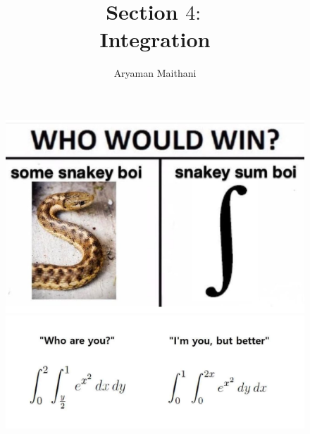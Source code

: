 \documentclass[handout, aspectratio=169]{beamer}
\begin{document}
\title{Section $4:$\\ Integration}
\author{ }
\begin{frame} 
	\titlepage
\end{frame}
	\author{Aryaman Maithani}
\begin{frame} 
	\begin{figure}[t]
		\begin{minipage}{0.5\textwidth}
			\centering
			\includegraphics[width=7 cm]{2.jpg}
			
		\end{minipage}
		\begin{minipage}{0.46\textwidth}
			\centering
			\includegraphics[width=7.5 cm]{8.jpg}
			
		\end{minipage}
	\end{figure}
\end{frame}
\end{document}
